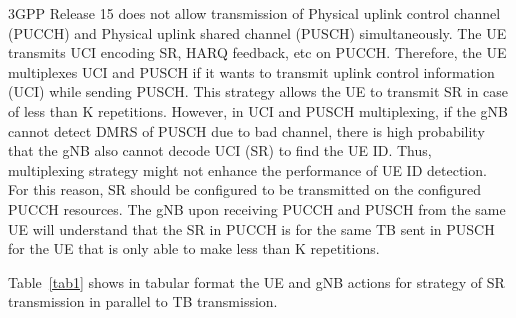 \documentclass[conference]{IEEEtran}
\begin{document}
3GPP Release 15 does not allow transmission of Physical uplink control channel (PUCCH) and Physical uplink shared channel (PUSCH) simultaneously. The UE transmits UCI encoding SR, HARQ feedback, etc on PUCCH. Therefore, the UE multiplexes UCI and PUSCH if it wants to transmit uplink control information (UCI) while sending PUSCH. This strategy allows the UE to transmit SR in case of less than K repetitions. However, in UCI and PUSCH  multiplexing, if the gNB cannot detect DMRS of PUSCH due to bad channel, there is high probability that the gNB also cannot decode UCI (SR) to find the UE ID. Thus, multiplexing strategy might not enhance the performance of UE ID detection. For this reason, SR should be configured to be transmitted on the configured PUCCH resources. The gNB upon receiving PUCCH and PUSCH from the same UE will understand that the SR in PUCCH is for the same TB sent in PUSCH for the UE that is only able to make less than K repetitions.

Table~\ref{tab1} shows in tabular format the UE and gNB actions for strategy of SR transmission in parallel to TB transmission. 
\end{document}
